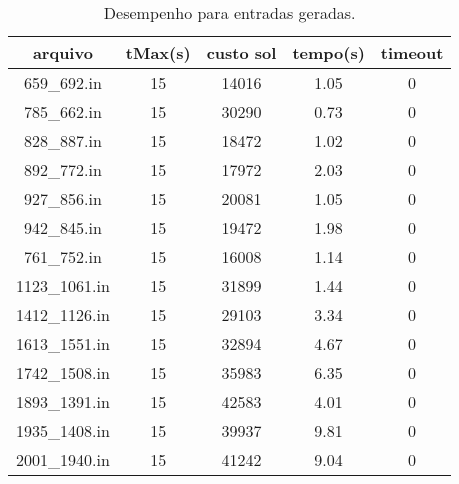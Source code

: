 \begin{table}[H]
\caption{Desempenho para entradas geradas.}
\centering
\begin{tabular}{|c|c|c|c|c|}
\hline
arquivo & tMax(s) & custo sol & tempo(s) & timeout\\
\hline
659\_692.in & 15 & 14016 & 1.05 & 0\\
\hline
785\_662.in & 15 & 30290 & 0.73 & 0\\
\hline
828\_887.in & 15 & 18472 & 1.02 & 0\\
\hline
892\_772.in & 15 & 17972 & 2.03 & 0\\
\hline
927\_856.in & 15 & 20081 & 1.05 & 0\\
\hline
942\_845.in & 15 & 19472 & 1.98 & 0\\
\hline
761\_752.in & 15 & 16008 & 1.14 & 0\\
\hline
1123\_1061.in & 15 & 31899 & 1.44 & 0\\
\hline
1412\_1126.in & 15 & 29103 & 3.34 & 0\\
\hline
1613\_1551.in & 15 & 32894 & 4.67 & 0\\
\hline
1742\_1508.in & 15 & 35983 & 6.35 & 0\\
\hline
1893\_1391.in & 15 & 42583 & 4.01 & 0\\
\hline
1935\_1408.in & 15 & 39937 & 9.81 & 0\\
\hline
2001\_1940.in & 15 & 41242 & 9.04 & 0\\
\hline
\end{tabular}
\end{table}
